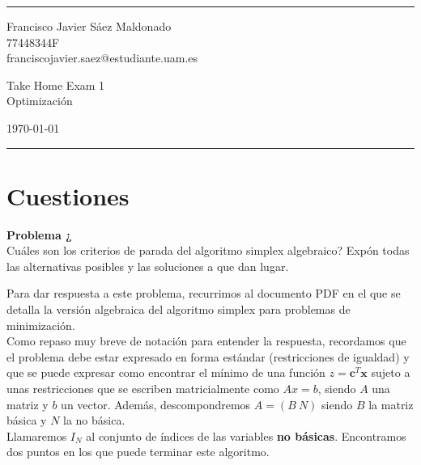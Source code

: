 \documentclass[a4paper]{article}
\newenvironment{problem}[2][Problema]
    { \begin{mdframed}[backgroundcolor=gray!20] \textbf{#1 #2} \\}
    {  \end{mdframed}}
\begin{document}

\fancyhead[C]{}
\hrule \medskip %
\begin{minipage}{0.295\textwidth}
\raggedright
\footnotesize
Francisco Javier Sáez Maldonado \hfill\\
77448344F \hfill\\
franciscojavier.saez@estudiante.uam.es
\end{minipage}
\begin{minipage}{0.4\textwidth}
\centering
\large
Take Home Exam 1\\
\normalsize
Optimización\\
\end{minipage}
\begin{minipage}{0.295\textwidth}
\raggedleft
\today\hfill\\
\end{minipage}
\medskip\hrule
\bigskip

\section{Cuestiones}

\begin{problem}{1}
¿Cuáles son los criterios de parada del algoritmo simplex algebraico? Expón todas las alternativas posibles y las soluciones a que dan lugar.
\end{problem}

Para dar respuesta a este problema, recurrimos al documento PDF en el que se detalla la versión algebraica del algoritmo simplex para problemas de minimización.\\

Como repaso muy breve de notación para entender la respuesta, recordamos que el problema debe estar expresado en forma estándar (restricciones de igualdad) y que se puede expresar como encontrar el mínimo de una función \(z = \mathbf{c}^T \mathbf{x}\) sujeto a unas restricciones que se escriben matricialmente como \(Ax = b\), siendo \(A\) una matriz y \(b\) un vector. Además, descompondremos \(A = (B \ N)\) siendo \(B\) la matriz básica y \(N\) la no básica.\\

Llamaremos \(I_N\) al conjunto de índices de las variables \textbf{no básicas}. Encontramos dos puntos en los que puede terminar este algoritmo.
\end{document}
